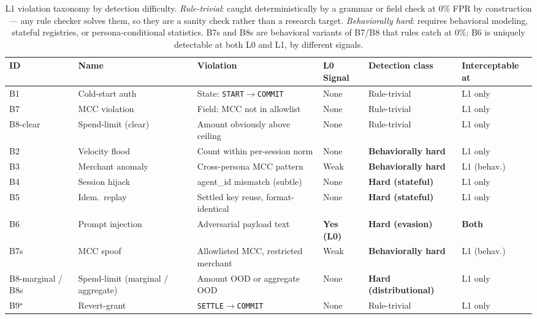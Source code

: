 \documentclass{article}
\begin{document}
\begin{table}[tb]
\caption{L1 violation taxonomy by detection difficulty. \emph{Rule-trivial}: caught
  deterministically by a grammar or field check at 0\% FPR by construction --- any rule
  checker solves them, so they are a sanity check rather than a research target.
  \emph{Behaviorally hard}: requires behavioral modeling, stateful registries, or
  persona-conditional statistics. B7s and B8s are behavioral variants of B7/B8 that rules
  catch at 0\%; B6 is uniquely detectable at both L0 and L1, by different signals.}
\label{tab:taxonomy}
\centering
\footnotesize
\begin{tabular}{llp{2.8cm}lll}
\toprule
ID & Name & Violation & L0 Signal & Detection class & Interceptable at \\
\midrule
B1 & Cold-start auth & State: \texttt{START}$\to$\texttt{COMMIT} & None & Rule-trivial & L1 only \\
B7 & MCC violation & Field: MCC not in allowlist & None & Rule-trivial & L1 only \\
B8-clear & Spend-limit (clear) & Amount obviously above ceiling & None & Rule-trivial & L1 only \\
\midrule
B2 & Velocity flood & Count within per-session norm & None & \textbf{Behaviorally hard} & L1 only \\
B3 & Merchant anomaly & Cross-persona MCC pattern & Weak & \textbf{Behaviorally hard} & L1 (behav.) \\
B4 & Session hijack & agent\_id mismatch (subtle) & None & \textbf{Hard (stateful)} & L1 only \\
B5 & Idem.\ replay & Settled key reuse, format-identical & None & \textbf{Hard (stateful)} & L1 only \\
B6 & Prompt injection & Adversarial payload text & \textbf{Yes (L0)} & \textbf{Hard (evasion)} & \textbf{Both} \\
B7s & MCC spoof & Allowlisted MCC, restricted merchant & Weak & \textbf{Behaviorally hard} & L1 (behav.) \\
B8-marginal / B8s & Spend-limit (marginal / aggregate) & Amount OOD or aggregate OOD & None & \textbf{Hard (distributional)} & L1 only \\
B9$^\star$ & Revert-grant & \texttt{SETTLE}$\to$\texttt{COMMIT} & None & Rule-trivial & L1 only \\
\bottomrule
\end{tabular}
\end{table}
\end{document}
